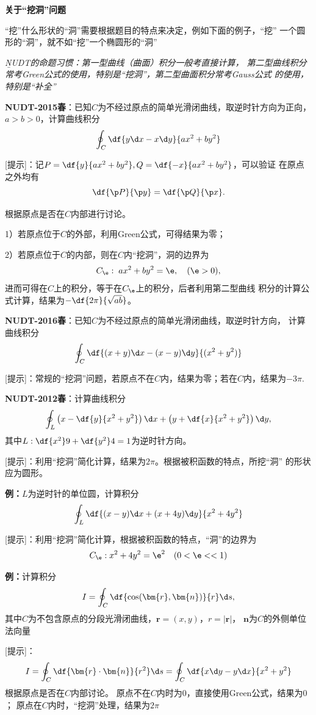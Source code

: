 \begin{shaded}
	{\bf 关于“挖洞”问题}
	
	“挖”什么形状的“洞”需要根据题目的特点来决定，例如下面的例子，“挖”
	一个圆形的“洞”，就不如“挖”一个椭圆形的“洞”
	
	{\it\b NUDT的命题习惯：第一型曲线（曲面）积分一般考直接计算，
	第二型曲线积分常考Green公式的使用，特别是“挖洞”，第二型曲面积分常考Gauss公式
	的使用，特别是“补全”}
	
	{\bf NUDT-2015春}：已知$C$为不经过原点的简单光滑闭曲线，取逆时针方向为正向，
	$a>b>0$，计算曲线积分
	$$\oint_C\df{y\d x-x\d y}{ax^2+by^2}$$
	
	[提示]：记$P=\df{y}{ax^2+by^2},Q=\df{-x}{ax^2+by^2}$，可以验证
	在原点之外均有
	$$\df{\p P}{\p y}=\df{\p Q}{\p x}.$$
	
	根据原点是否在$C$内部进行讨论。
	
	1）若原点位于$C$的外部，利用Green公式，可得结果为零；
	
	2）若原点位于$C$的内部，则在$C$内“挖洞”，洞的边界为
	$$C_{\e}:\;ax^2+by^2=\e,\quad(\e>0),$$
	进而可得在$C$上的积分，等于在$C_{\e}$上的积分，后者利用第二型曲线
	积分的计算公式计算，结果为$-\df{2\pi}{\sqrt{ab}}$。
	
	{\bf NUDT-2016春}：已知$C$为不经过原点的简单光滑闭曲线，取逆时针方向，
	计算曲线积分
	$$\oint_C\df{(x+y)\d x-(x-y)\d y}{(x^2+y^2)}$$
	
	[提示]：常规的“挖洞”问题，若原点不在$C$内，结果为零；若在$C$内，结果为$-3\pi$.
	
	{\bf NUDT-2012春}：计算曲线积分
	$$\oint_L\left(x-\df{y}{x^2+y^2}\right)\d x
	+\left(y+\df{x}{x^2+y^2}\right)\d y,$$
	其中$L:\df{x^2}9+\df{y^2}4=1$为逆时针方向。
	
	[提示]：利用“挖洞”简化计算，结果为$2\pi$。根据被积函数的特点，所挖“洞”
	的形状应为圆形。
	
	{\bf 例：}$L$为逆时针的单位圆，计算积分
	$$\oint_L\df{(x-y)\d x+(x+4y)\d y}
	{x^2+4y^2}$$
	
	[提示]：利用“挖洞”简化计算，根据被积函数的特点，“洞”的边界为
	$$C_{\e}:x^2+4y^2=\e^2\quad(0<\e<<1)$$
	
	{\bf 例：}计算积分
	$$I=\oint_C\df{\cos(\bm{r},\bm{n})}{r}\d s,$$
	其中$C$为不包含原点的分段光滑闭曲线，$\bm{r}=(x,y)$，$r=|\bm{r}|$，
	$\bm{n}$为$C$的外侧单位法向量
		
	[提示]：
	$$I=\oint_C\df{\bm{r}\cdot\bm{n}}{r^2}\d s
	=\oint_C\df{x\d y-y\d x}{x^2+y^2}$$
	根据原点是否在$C$内部讨论。
	原点不在$C$内时为$0$，直接使用Green公式，结果为$0$；
	原点在$C$内时，“挖洞”处理，结果为$2\pi$
	

\end{shaded}

